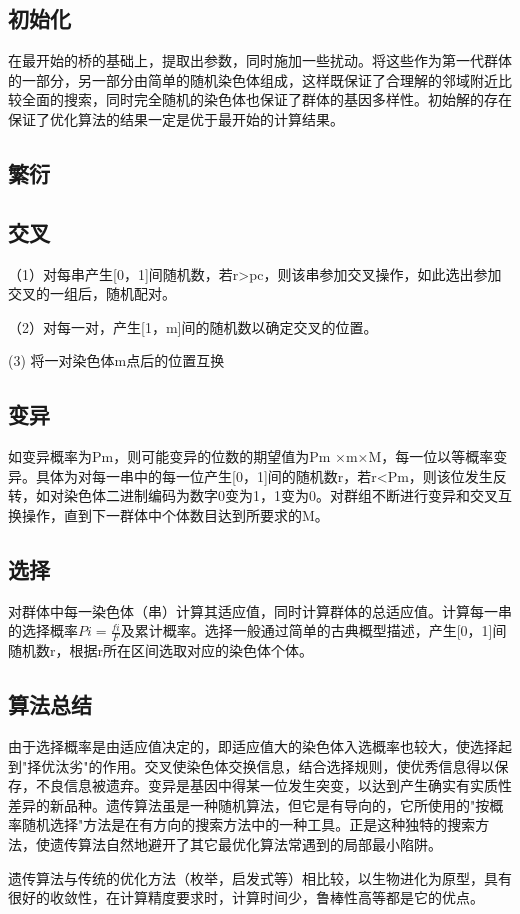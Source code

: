 \documentclass[forprint]{WHUBachelor}
\begin{document}
\subsection{初始化} 
在最开始的桥的基础上，提取出参数，同时施加一些扰动。将这些作为第一代群体的一部分，另一部分由简单的随机染色体组成，这样既保证了合理解的邻域附近比较全面的搜索，同时完全随机的染色体也保证了群体的基因多样性。初始解的存在保证了优化算法的结果一定是优于最开始的计算结果。
\subsection{繁衍}
\subsection{交叉}
（1）对每串产生[0，1]间随机数，若r>pc，则该串参加交叉操作，如此选出参加交叉的一组后，随机配对。\par
（2）对每一对，产生[1，m]间的随机数以确定交叉的位置。\par
 (3) 将一对染色体m点后的位置互换
\subsection{变异}
如变异概率为Pm，则可能变异的位数的期望值为Pm ×m×M，每一位以等概率变异。具体为对每一串中的每一位产生[0，1]间的随机数r，若r<Pm，则该位发生反转，如对染色体二进制编码为数字0变为1，1变为0。对群组不断进行变异和交叉互换操作，直到下一群体中个体数目达到所要求的M。
\subsection{选择}
对群体中每一染色体（串）计算其适应值，同时计算群体的总适应值。计算每一串的选择概率$Pi=\frac{fi}{F}$及累计概率。选择一般通过简单的古典概型描述，产生[0，1]间随机数r，根据r所在区间选取对应的染色体个体。
\subsection{算法总结}
由于选择概率是由适应值决定的，即适应值大的染色体入选概率也较大，使选择起到"择优汰劣"的作用。交叉使染色体交换信息，结合选择规则，使优秀信息得以保存，不良信息被遗弃。变异是基因中得某一位发生突变，以达到产生确实有实质性差异的新品种。遗传算法虽是一种随机算法，但它是有导向的，它所使用的"按概率随机选择"方法是在有方向的搜索方法中的一种工具。正是这种独特的搜索方法，使遗传算法自然地避开了其它最优化算法常遇到的局部最小陷阱。\par
遗传算法与传统的优化方法（枚举，启发式等）相比较，以生物进化为原型，具有很好的收敛性，在计算精度要求时，计算时间少，鲁棒性高等都是它的优点。
\end{document}
